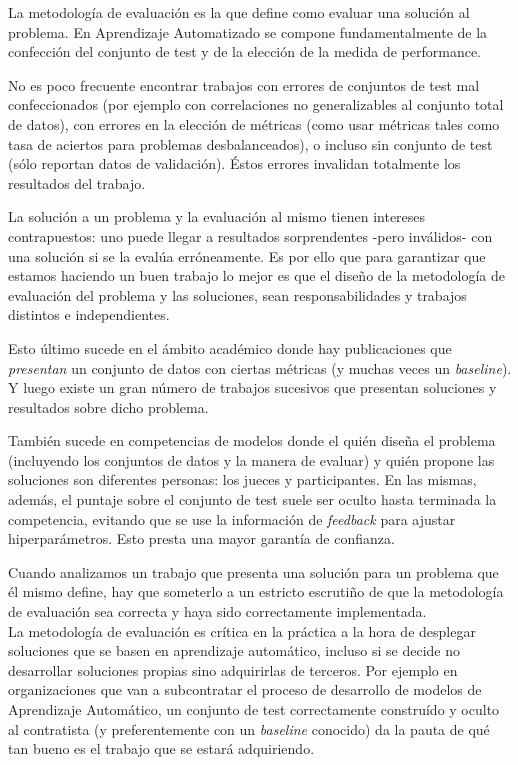 La metodología de evaluación es la que define como evaluar una solución al problema. En Aprendizaje Automatizado se compone fundamentalmente de la confección del conjunto de test y de la elección de la medida de performance.

No es poco frecuente encontrar trabajos con errores de conjuntos de test mal confeccionados (por ejemplo con correlaciones no generalizables al conjunto total de datos), con errores en la elección de métricas (como usar métricas tales como tasa de aciertos para problemas desbalanceados), o incluso sin conjunto de test (sólo reportan datos de validación). Éstos errores invalidan totalmente los resultados del trabajo.

La solución a un problema y la evaluación al mismo tienen intereses contrapuestos: uno puede llegar a resultados sorprendentes -pero inválidos- con una solución si se la evalúa erróneamente.  Es por ello que para garantizar que estamos haciendo un buen trabajo lo mejor es que el diseño de la metodología de evaluación del problema y las soluciones, sean responsabilidades y trabajos distintos e independientes.

Esto último sucede en el ámbito académico donde hay publicaciones que \textit{presentan} un conjunto de datos con ciertas métricas (y muchas veces un \textit{baseline}). Y luego existe un gran número de trabajos sucesivos que presentan soluciones y resultados sobre dicho problema.

También sucede en competencias de modelos donde el quién diseña el problema (incluyendo los conjuntos de datos y la manera de evaluar) y quién propone las soluciones son diferentes personas: los jueces y participantes. En las mismas, además, el puntaje sobre el conjunto de test suele ser oculto hasta terminada la competencia, evitando que se use la información de \textit{feedback} para ajustar hiperparámetros. Esto presta una mayor garantía de confianza. 

Cuando analizamos un trabajo que presenta una solución para un problema que él mismo define, hay que someterlo a un estricto escrutiño de que la metodología de evaluación sea correcta y haya sido correctamente implementada. \\

La metodología de evaluación es crítica en la práctica a la hora de desplegar soluciones que se basen en aprendizaje automático, incluso si se decide no desarrollar soluciones propias sino adquirirlas de terceros. Por ejemplo en organizaciones que van a subcontratar el proceso de desarrollo de modelos de Aprendizaje Automático, un conjunto de test correctamente construído y oculto al contratista (y preferentemente con un \textit{baseline} conocido) da la pauta de qué tan bueno es el trabajo que se estará adquiriendo.

